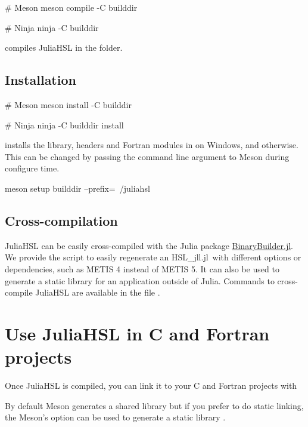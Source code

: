 \documentclass[gdweb]{geradwp}
\newcommand{\HSLjll}{HSL\_jll.jl}
\begin{document}
\begin{jllisting}
# Meson
meson compile -C builddir

# Ninja
ninja -C builddir
\end{jllisting}
compiles JuliaHSL in the  folder.

\subsection{Installation}

\begin{jllisting}
# Meson
meson install -C builddir

# Ninja
ninja -C builddir install
\end{jllisting}
installs the library, headers and Fortran modules in  on Windows, and  otherwise.
This can be changed by passing the command line argument  to Meson during configure time.
\begin{jllisting}
meson setup builddir --prefix=~/juliahsl
\end{jllisting}

\subsection{Cross-compilation}

JuliaHSL can be easily cross-compiled with the Julia package \href{https://github.com/JuliaPackaging/BinaryBuilder.jl}{BinaryBuilder.jl}.
We provide the script  to easily regenerate an \HSLjll~with different options or dependencies, such as METIS 4 instead of METIS 5.
It can also be used to generate a static library  for an application outside of Julia.
Commands to cross-compile JuliaHSL are available in the file .

\section{Use JuliaHSL in C and Fortran projects}

Once JuliaHSL is compiled, you can link it to your C and Fortran projects with
By default Meson generates a shared library but if you prefer to do static linking, the Meson's option  can be used to generate a static library .
\end{document}
